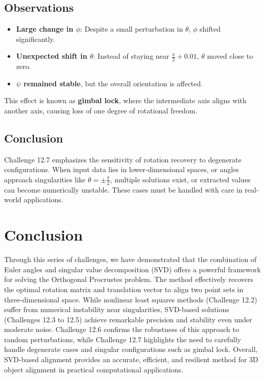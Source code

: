 \documentclass[12pt]{article}
\begin{document}
\subsection*{Observations}

\begin{itemize}
    \item \textbf{Large change in \( \phi \)}: Despite a small perturbation in \( \theta \), \( \phi \) shifted significantly.
    \item \textbf{Unexpected shift in \( \theta \)}: Instead of staying near \( \frac{\pi}{2} + 0.01 \), \( \theta \) moved close to zero.
    \item \textbf{\( \psi \) remained stable}, but the overall orientation is affected.
\end{itemize}


This effect is known as \textbf{gimbal lock}, where the intermediate axis aligns with another axis, causing loss of one degree of rotational freedom.

\subsection*{Conclusion}
Challenge 12.7 emphasizes the sensitivity of rotation recovery to degenerate configurations. When input data lies in lower-dimensional spaces, or angles approach singularities like \( \theta = \pm \frac{\pi}{2} \), multiple solutions exist, or extracted values can become numerically unstable. These cases must be handled with care in real-world applications.





\section*{Conclusion}
Through this series of challenges, we have demonstrated that the combination of Euler angles and singular value decomposition (SVD) offers a powerful framework for solving the Orthogonal Procrustes problem. The method effectively recovers the optimal rotation matrix and translation vector to align two point sets in three-dimensional space. While nonlinear least squares methods (Challenge 12.2) suffer from numerical instability near singularities, SVD-based solutions (Challenges 12.3 to 12.5) achieve remarkable precision and stability even under moderate noise. Challenge 12.6 confirms the robustness of this approach to random perturbations, while Challenge 12.7 highlights the need to carefully handle degenerate cases and singular configurations such as gimbal lock. Overall, SVD-based alignment provides an accurate, efficient, and resilient method for 3D object alignment in practical computational applications.
\pagebreak
\end{document}
